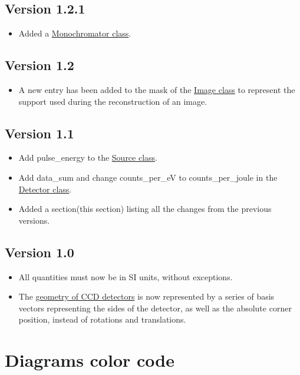 \documentclass[usletter,11pt]{article}
\begin{document}
\subsection{Version 1.2.1}
\begin{itemize}
\item{Added a \hyperref[table:monochromator]{Monochromator class}.}
\end{itemize}
\subsection{Version 1.2}
\begin{itemize}
\item{A new entry has been added to the mask of the \hyperref[table:image]{Image class}
to represent the support used during the reconstruction of an image.}
\end{itemize}
\subsection{Version 1.1}
\begin{itemize}
\item{Add pulse\_energy to the \hyperref[table:source]{Source class}.}
\item{Add data\_sum and change counts\_per\_eV to counts\_per\_joule in the \hyperref[table:detector]{Detector class}.}
\item{Added a section(this section) listing all the changes from the
   previous versions.}
\end{itemize}

\subsection{Version 1.0}
\begin{itemize}
\item{All quantities must now be in SI units, without exceptions.}
\item{The \hyperref[ccd_orientation]{geometry of CCD detectors} is now represented by a series of
    basis vectors representing the sides of the detector, as well as
    the absolute corner position, instead of rotations and translations.}
\end{itemize}


\clearpage
\section{Diagrams color code}
\label{color_code}
\end{document}
